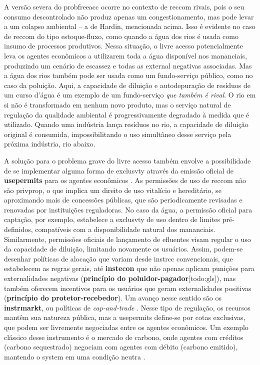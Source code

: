 \documentclass[./main.tex]{subfiles}
\begin{document}
\par A versão severa do \gls{probfreeacc} ocorre no contexto de \gls{reccom} rivais, pois o seu consumo descontrolado não produz apenas um congestionamento, mas pode levar a um colapso ambiental -- a  de Hardin, mencionada acima. Isso é evidente no caso de \gls{reccom} do tipo estoque-fluxo, como quando a água dos rios é usada como insumo de processos produtivos. Nessa situação, o livre acesso potencialmente leva os agentes econômicos a utilizarem toda a água disponível nos mananciais, produzindo um cenário de escassez e todas as \gls{external} negativas associadas. Mas a água dos rios também pode ser usada como um fundo-serviço público, como no caso da poluição. Aqui, a capacidade de diluição e autodepuração de resíduos de um curso d'água é um exemplo de um fundo-serviço \textit{que também é rival}. O rio em si não é transformado em nenhum novo produto, mas o serviço natural de regulação da qualidade ambiental é progressivamente degradado à medida que é utilizado. Quando uma indústria lança resíduos no rio, a capacidade de diluição original é consumida, impossibilitando o uso simultâneo desse serviço pela próxima indústria, rio abaixo. 

\par A solução para o problema grave do livre acesso também envolve a possibilidade de se implementar alguma forma de \gls{exclusvty} através da emissão oficial de \textbf{\gls{usepermits}} para os agentes econômicos \cite{Schlager1992}. As permissões de uso de \gls{reccom} não são \gls{privprop}, o que implica um direito de uso vitalício e hereditário, se aproximando mais de concessões públicas, que são periodicamente revisadas e renovadas por instituições reguladoras. No caso da água, a permissão oficial para captação, por exemplo, estabelece a \gls{exclusvty} de uso dentro de limites pré-definidos, compatíveis com a disponibilidade natural dos mananciais. Similarmente, permissões oficiais de lançamento de efluentes visam regular o uso da capacidade de diluição, limitando novamente os usuários. Assim, podem-se desenhar políticas de alocação que variam desde \gls{instrcc} convencionais, que estabelecem as regras gerais, até \textbf{\gls{instecon}} que não apenas aplicam punições para externalidades negativas (\textbf{princípio do poluidor-pagador}[todo:gls]), mas também oferecem incentivos para os usuários que geram externalidades positivas (\textbf{princípio do protetor-recebedor}). Um avanço nesse sentido são os \textbf{\gls{instrmarkt}}, ou políticas de \textit{cap-and-trade} \cite{Borghesi2013}. Nesse tipo de regulação, os recursos mantêm sua natureza pública, mas a \gls{usepermits} define-se por cotas exclusivas, que podem ser livremente negociadas entre os agentes econômicos. Um exemplo clássico desse instrumento é o mercado de carbono, onde agentes com créditos (carbono sequestrado) negociam com agentes com débito (carbono emitido), mantendo o \gls{system} em uma condição neutra \cite{Mazaheri2022}.
\end{document}
